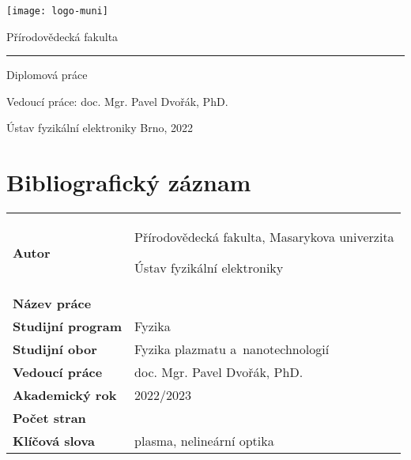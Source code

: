 \pagestyle{empty}

\sffamily
\begin{center}
	\texttt{[image: logo-muni]}
\end{center}
\begin{center}
	\huge Přírodovědecká fakulta
\end{center}
\hrule
\vfill

\begin{flushleft}
\huge\noindent
\textbf{\thetitle}
\end{flushleft}
\bigskip

\large\noindent
Diplomová práce
\bigskip

\Large\noindent
\theauthor
\vfill

\Large\noindent
Vedoucí práce: doc. Mgr. Pavel Dvořák, PhD.
\bigskip

\Large\noindent
Ústav fyzikální elektroniky
\hfill
Brno, 2022

\normalsize
\rmfamily
\cleardoublepage

\def\bibentryspacing{2}
\chapter*{Bibliografický záznam}
\thispagestyle{empty}
\bgroup
\renewcommand{\arraystretch}{\bibentryspacing}
\begin{tabularx}{\textwidth}{l X}
	\textbf{Autor}            & \theauthor\par
	                            Přírodovědecká fakulta,
	                            Masarykova univerzita\par
	                            Ústav fyzikální elektroniky \\
	\textbf{Název práce}      & \thetitle \\
	\textbf{Studijní program} & Fyzika \\
	\textbf{Studijní obor}    & Fyzika plazmatu a~nanotechnologií \\
	\textbf{Vedoucí práce}    & doc. Mgr. Pavel Dvořák, PhD. \\
	\textbf{Akademický rok}   & 2022/2023 \\
	\textbf{Počet stran}      & \pageref*{lastpage} \\
	\textbf{Klíčová slova}    & plasma, nelineární optika \\
\end{tabularx}
\egroup
\cleardoublepage
